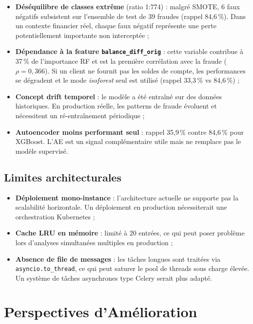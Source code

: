 \documentclass[12pt,a4paper,twoside]{report}
\theoremstyle{definition}
\begin{document}
\begin{itemize}
  \item \textbf{Déséquilibre de classes extrême} (ratio 1:774) : malgré SMOTE,
    6 faux négatifs subsistent sur l'ensemble de test de 39 fraudes (rappel 84,6\,\%).
    Dans un contexte financier réel, chaque faux négatif représente une perte
    potentiellement importante non interceptée ;

  \item \textbf{Dépendance à la feature \texttt{balance\_diff\_orig}} : cette
    variable contribue à 37\,\% de l'importance RF et est la première corrélation
    avec la fraude ($\rho = 0,366$). Si un client ne fournit pas les soldes de
    compte, les performances se dégradent et le mode \textit{isoforest} seul
    est utilisé (rappel 33,3\,\% vs 84,6\,\%) ;

  \item \textbf{Concept drift temporel} : le modèle a été entraîné sur des
    données historiques. En production réelle, les patterns de fraude évoluent
    et nécessitent un ré-entraînement périodique ;

  \item \textbf{Autoencoder moins performant seul} : rappel 35,9\,\% contre
    84,6\,\% pour XGBoost. L'AE est un signal complémentaire utile mais
    ne remplace pas le modèle supervisé.
\end{itemize}

\subsection{Limites architecturales}

\begin{itemize}
  \item \textbf{Déploiement mono-instance} : l'architecture actuelle ne supporte
    pas la scalabilité horizontale. Un déploiement en production nécessiterait
    une orchestration Kubernetes ;
  \item \textbf{Cache LRU en mémoire} : limité à 20 entrées, ce qui peut
    poser problème lors d'analyses simultanées multiples en production ;
  \item \textbf{Absence de file de messages} : les tâches longues sont traitées
    via \texttt{asyncio.to\_thread}, ce qui peut saturer le pool de threads
    sous charge élevée. Un système de tâches asynchrones type Celery serait
    plus adapté.
\end{itemize}

\section{Perspectives d'Amélioration}
\end{document}
